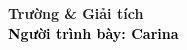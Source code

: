 \begin{frame}[noframenumbering]
    \thispagestyle{empty}
    \bfseries
    \begin{flushleft}
        \vfill
        \vspace{5mm}
        \textcolor{BlueDefault}{\huge \bfseries Trường \& Giải tích} \\
        \vspace{8mm}
        \textcolor{black}{\large \bfseries Người trình bày: Carina }
        \vfill
    \end{flushleft}
\end{frame}